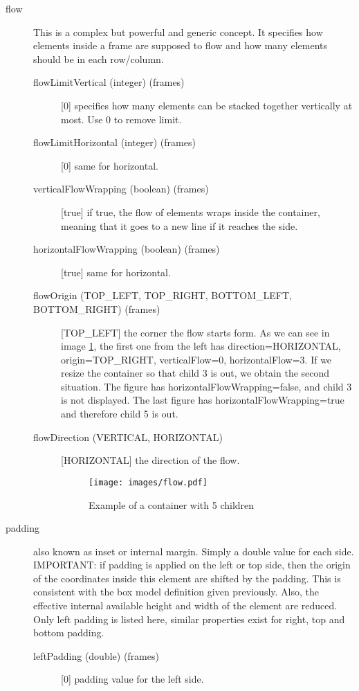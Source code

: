\begin{description}
\item[flow] This is a complex but powerful and generic concept. It specifies how elements inside a frame are supposed to flow and how many elements should be in each row/column.
\begin{description}
    \item[flowLimitVertical (integer) (frames) ] [0] specifies how many elements can be stacked together vertically at most. Use 0 to remove limit.
    \item[flowLimitHorizontal (integer) (frames)] [0] same for horizontal.
    \item[verticalFlowWrapping (boolean) (frames)] [true] if true, the flow of elements wraps inside the container, meaning that it goes to a new line if it reaches the side.
    \item[horizontalFlowWrapping (boolean) (frames)] [true] same for horizontal.
    \item[flowOrigin (TOP\_LEFT, TOP\_RIGHT, BOTTOM\_LEFT, BOTTOM\_RIGHT) (frames)] [TOP\_LEFT] the corner the flow starts form. As we can see in image \ref{img:flow}, the first one from the left has direction=HORIZONTAL, origin=TOP\_RIGHT, verticalFlow=0, horizontalFlow=3. If we resize the container so that child 3 is out, we obtain the second situation. The figure has horizontalFlowWrapping=false, and child 3 is not displayed. The last figure has horizontalFlowWrapping=true and therefore child 5 is out.
    \item[flowDirection (VERTICAL, HORIZONTAL)] [HORIZONTAL] the direction of the flow.
    \begin{figure}[ht!]
    \centering
    \texttt{[image: images/flow.pdf]}
    \caption{Example of a container with 5 children} \label{img:flow}
    \end{figure}
\end{description}

\item[padding] also known as inset or internal margin. Simply a double value for each side. IMPORTANT: if padding is applied on the left or top side, then the origin of the coordinates inside this element are shifted by the padding. This is consistent with the box model definition given previously. Also, the effective internal available height and width of the element are reduced. Only left padding is listed here, similar properties exist for right, top and bottom padding.
\begin{description}
    \item[leftPadding (double) (frames)] [0] padding value for the left side.
\end{description}


\end{description}
